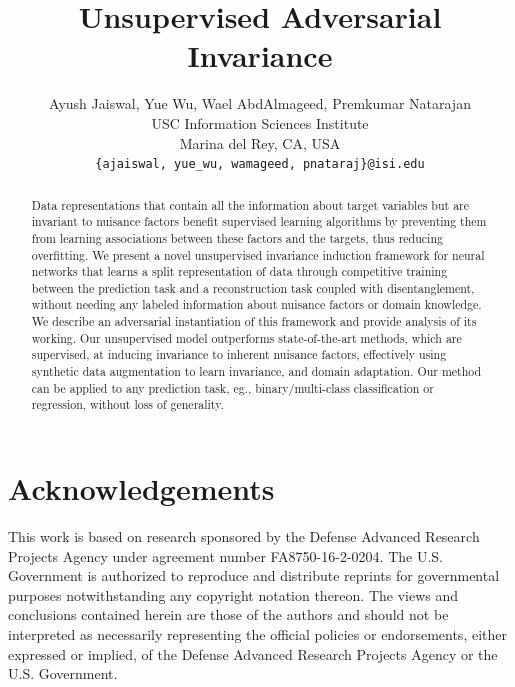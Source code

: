 \documentclass{article}
\title{Unsupervised Adversarial Invariance}
\author{
  Ayush Jaiswal, Yue Wu, Wael AbdAlmageed, Premkumar Natarajan\\
USC Information Sciences Institute\\
Marina del Rey, CA, USA\\
{\tt\small \{ajaiswal, yue\_wu, wamageed, pnataraj\}@isi.edu}
}
\begin{document}

\maketitle

\begin{abstract}
Data representations that contain all the information about target variables but are invariant to nuisance factors benefit supervised learning algorithms by preventing them from learning associations between these factors and the targets, thus reducing overfitting. We present a novel unsupervised invariance induction framework for neural networks that learns a split representation of data through competitive training between the prediction task and a reconstruction task coupled with disentanglement, without needing any labeled information about nuisance factors or domain knowledge. We describe an adversarial instantiation of this framework and provide analysis of its working. Our unsupervised model outperforms state-of-the-art methods, which are supervised, at inducing invariance to inherent nuisance factors, effectively using synthetic data augmentation to learn invariance, and domain adaptation. Our method can be applied to any prediction task, eg., binary/multi-class classification or regression, without loss of generality.
\end{abstract}

















\section*{Acknowledgements}
This work is based on research sponsored by the Defense Advanced Research Projects Agency under agreement number FA8750-16-2-0204. The U.S. Government is authorized to reproduce and distribute reprints for governmental purposes  notwithstanding any copyright notation thereon. The views and conclusions contained herein are those of the authors and should not be interpreted as necessarily representing the official policies or endorsements, either expressed or implied, of the Defense Advanced Research Projects Agency or the U.S. Government.

{\small


}
\end{document}
